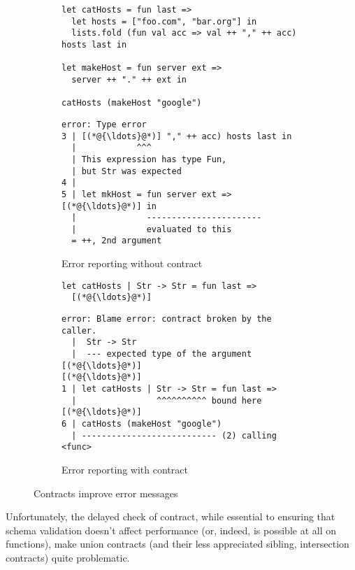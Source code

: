 \documentclass[sigplan,10pt,review,anonymous]{acmart}
\begin{document}
\begin{figure*}
  \centering
  \begin{subfigure}[b]{0.48\linewidth}
    \begin{lstlisting}[language=nickel]
let catHosts = fun last =>
  let hosts = ["foo.com", "bar.org"] in
  lists.fold (fun val acc => val ++ "," ++ acc) hosts last in

let makeHost = fun server ext =>
  server ++ "." ++ ext in

catHosts (makeHost "google")
\end{lstlisting}

    \begin{lstlisting}[frame=none,numbers=none, basicstyle=\footnotesize\ttfamily]
error: Type error
3 | [(*@{\ldots}@*)] "," ++ acc) hosts last in
  |            ^^^
  | This expression has type Fun,
  | but Str was expected
4 |
5 | let mkHost = fun server ext => [(*@{\ldots}@*)] in
  |              -----------------------
  |              evaluated to this
  = ++, 2nd argument
\end{lstlisting}
    \caption{Error reporting without contract}
    \label{fig:contract-reporting-wo}
  \end{subfigure}
  \hfill
  \begin{subfigure}[b]{0.48\linewidth}
    \begin{lstlisting}[language=nickel]
let catHosts | Str -> Str = fun last =>
  [(*@{\ldots}@*)]
\end{lstlisting}
\vspace{10ex}
    \begin{lstlisting}[frame=none,numbers=none, basicstyle=\footnotesize\ttfamily]
error: Blame error: contract broken by the caller.
  |  Str -> Str
  |  --- expected type of the argument [(*@{\ldots}@*)]
[(*@{\ldots}@*)]
1 | let catHosts | Str -> Str = fun last =>
  |                ^^^^^^^^^^ bound here
[(*@{\ldots}@*)]
6 | catHosts (makeHost "google")
  | --------------------------- (2) calling <func>
    \end{lstlisting}
    \caption{Error reporting with contract}
    \label{fig:contract-reporting-w}
  \end{subfigure}
  \caption{Contracts improve error messages}
\end{figure*}

Unfortunately, the delayed check of contract, while essential to
ensuring that schema validation doesn't affect performance (or, indeed,
is possible at all on functions), make union contracts (and their less
appreciated sibling, intersection contracts) quite problematic.
\end{document}
